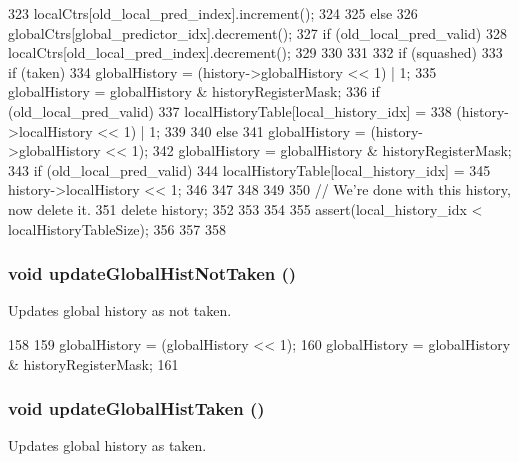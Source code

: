 \begin{DoxyCode}
{{{{{323                           localCtrs[old_local_pred_index].increment();
324                   }
325              } else {
326                   globalCtrs[global_predictor_idx].decrement();
327                   if (old_local_pred_valid) {
328                           localCtrs[old_local_pred_index].decrement();
329                   }
330              }
331         }
332         if (squashed) {
333              if (taken) {
334                 globalHistory = (history->globalHistory << 1) | 1;
335                 globalHistory = globalHistory & historyRegisterMask;
336                 if (old_local_pred_valid) {
337                     localHistoryTable[local_history_idx] =
338                      (history->localHistory << 1) | 1;
339                 }
340              } else {
341                 globalHistory = (history->globalHistory << 1);
342                 globalHistory = globalHistory & historyRegisterMask;
343                 if (old_local_pred_valid) {
344                      localHistoryTable[local_history_idx] =
345                      history->localHistory << 1;
346                 }
347              }
348 
349         }
350         // We're done with this history, now delete it.
351         delete history;
352 
353     }
354 
355     assert(local_history_idx < localHistoryTableSize);
356 
357 
358 }
\end{DoxyCode}
\hypertarget{classTournamentBP_aa8baf2d471498ae49654c3398d7b1f1f}{
\subsubsection[{updateGlobalHistNotTaken}]{\setlength{\rightskip}{0pt plus 5cm}void updateGlobalHistNotTaken ()}}
\label{classTournamentBP_aa8baf2d471498ae49654c3398d7b1f1f}
Updates global history as not taken. 


\begin{DoxyCode}
158 {
159     globalHistory = (globalHistory << 1);
160     globalHistory = globalHistory & historyRegisterMask;
161 }
\end{DoxyCode}
\hypertarget{classTournamentBP_a134f4849d0956d21b8d179d9cc4d5484}{
\subsubsection[{updateGlobalHistTaken}]{\setlength{\rightskip}{0pt plus 5cm}void updateGlobalHistTaken ()}}
\label{classTournamentBP_a134f4849d0956d21b8d179d9cc4d5484}
Updates global history as taken. 


